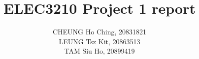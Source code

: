 \documentclass[10pt]{article}
\begin{document}
\author{CHEUNG Ho Ching, 20831821 \\ LEUNG Tsz Kit, 20863513\\ TAM Siu Ho, 20899419  } %
\title{ELEC3210 Project 1 report}
\maketitle




\end{document}
